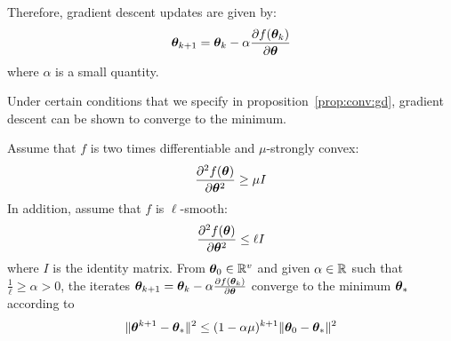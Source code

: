 Therefore, gradient descent updates are given by:
\begin{align}
  \thetab_{k+1} = \thetab_k -\alpha \partialfrac{\thetab}{f(\thetab_k)} \label{eq:update:gd}
\end{align}
where $\alpha$ is a small quantity.

Under certain conditions that we specify in proposition~\ref{prop:conv:gd},
gradient descent can be shown to converge to the minimum.

\begin{proposition}
  \label{prop:conv:gd}
  Assume that $f$ is two times differentiable and $\mu$-strongly convex:
  \begin{equation}
    \partialfrac{\thetab^2}{^2f(\thetab)} \geq \mu I
  \end{equation}
  In addition, assume that $f$ is $\ell$-smooth:
  \begin{equation}
    \partialfrac{\thetab^2}{^2f(\thetab)} \leq \ell I
  \end{equation}
  where $I$ is the identity matrix.
  From $\thetab_0 \in \RR^v$ and given $\alpha \in \RR$ such that $\frac1{\ell} \geq \alpha > 0$, the iterates
  $\thetab_{k+1} = \thetab_k -\alpha \partialfrac{\thetab}{f(\thetab_k)}$ converge to the
  minimum $\thetab_*$ according to
  \begin{equation}
    \| \thetab^{k+1} - \thetab_* \|^2 \leq (1 - \alpha \mu)^{k + 1} \| \thetab_0 - \thetab_* \|^2
  \end{equation}
\end{proposition}
